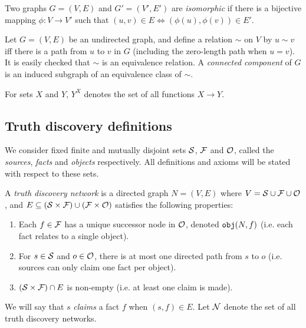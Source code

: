 \documentclass[../main.tex]{subfiles}
\begin{document}
\begin{definition}

Two graphs $G=(V, E)$ and $G'=(V', E')$ are \emph{isomorphic} if there is a
bijective mapping $\phi: V \rightarrow V'$ such that $(u, v) \in E \iff
(\phi(u), \phi(v)) \in E'$.

\end{definition}

\begin{definition}
Let $G=(V, E)$ be an undirected graph, and define a relation $\sim$ on $V$ by
$u \sim v$ iff there is a path from $u$ to $v$ in $G$ (including the
zero-length path when $u = v$). It is easily checked that $\sim$ is an
equivalence relation. A \emph{connected component} of $G$ is an induced
subgraph of an equivalence class of $\sim$.
\end{definition}

\begin{notation}
For sets $X$ and $Y$, $Y^X$ denotes the set of all functions $X \rightarrow Y$.
\end{notation}

\subsection{Truth discovery definitions}

We consider fixed finite and mutually disjoint sets $\S$, $\F$ and $\O$, called
the \emph{sources}, \emph{facts} and \emph{objects} respectively. All
definitions and axioms will be stated with respect to these sets.

\begin{definition}

A \emph{truth discovery network} is a directed graph $N = (V, E)$ where $V = \S
\cup \F \cup \O$, and $E \subseteq (\S \times \F) \cup (\F \times \O)$
satisfies the following properties:

\begin{enumerate}
\item Each $f \in \F$ has a unique successor node in $\O$, denoted $\obj(N, f)$
(i.e. each fact relates to a single object).

\item For $s \in \S$ and $o \in \O$, there is at most one directed path from
$s$ to $o$ (i.e. sources can only claim one fact per object).

\item $(\S \times \F) \cap E$ is non-empty (i.e. at least one claim is made).

\end{enumerate}
We will say that $s$ \emph{claims} a fact $f$ when $(s, f) \in E$. Let $\N$
denote the set of all truth discovery networks.
\end{definition}
\end{document}
